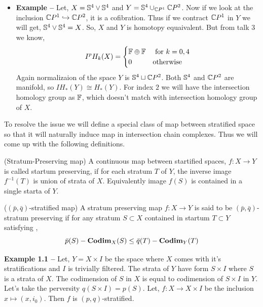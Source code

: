 \documentclass[11pt]{article}
\begin{document}
\begin{itemize}
    \item[] \textbf{Example -- } Let, $X = \mathbb{S}^4 \vee \mathbb{S}^4$ and $Y = \mathbb{S}^4 \cup_{\mathbb{C} P^1 } \mathbb{C} P^2$. Now if we look at the inclusion $\mathbb{C} P^1 \hookrightarrow \mathbb{C} P^2$, it is a cofibration. Thus if we contract $\mathbb{C} P^1$ in $Y$ we will get, $\mathbb{S}^4 \vee \mathbb{S}^4 = X$. So, $X$ and $Y$ is homotopy equaivalent. But from talk $3$ we know, \begin{align*}
        I^{p}H_{k}(X) = \begin{cases}
            \mathbb{F} \oplus \mathbb{F}  & \text{ for } k = 0,4 \\
            0 & \text{otherwise}
        \end{cases}
    \end{align*}
    Again normalizaion of the space $Y$ is $\mathbb{S}^4 \sqcup \mathbb{C} P^2$. Both $\mathbb{S}^4$ and $\mathbb{C} P^2$ are manifold, so $IH_{\ast}(Y) \cong H_{\ast}(Y)$. For index $2$ we will have the intersection homology group as $\mathbb{F}$, which doesn't match with intersection homology group of $X$.
\end{itemize}

\noindent To resolve the issue we will define a special class of map between stratified space so that it will naturally induce map in intersection chain complexes. Thus we will come up with the following definitions. 

\begin{Def}{(Stratum-Preserving map)}{}
     A continuous map between startified spaces, $f : X \to Y$ is called startum preserving, if for each stratum $T$ of $Y$, the inverse image $f^{-1}(T)$ is union of strata of $X$. Equivalently image $f(S)$ is contained in a single starta of $Y$.
\end{Def}

\begin{Def}{($(\bar{p},\bar{q})$-stratified map)}{}
    A stratum preserving map $f : X \to Y$ is said to be $(\bar{p},\bar{q})$-stratum preserving if for any stratum $S\subset X$ contained in startum $T \subset Y$ satisfying , $$\bar{p}(S)-\mathbf{Codim}_X(S) \leq \bar{q}(T) - \mathbf{Codim}_{Y}(T)$$
\end{Def}

\noindent \textbf{Example \textcolor{darkcerulean}{1.1} -- } Let, $Y = X\times I$ be the space where $X$ comes with it's stratifications and $I$ is trivially filtered. The strata of $Y$ have form $S \times I$ where $S$ is a strata of $X$. The codimension of $S$ in $X$ is equal to codimension of $S \times I$ in $Y$. Let's take the perversity $q(S\times I) = p(S)$. Let, $f : X \to X \times I$ be the inclusion $x \mapsto (x,i_0)$. Then $f$ is $(p,q)$-stratified.
\end{document}
